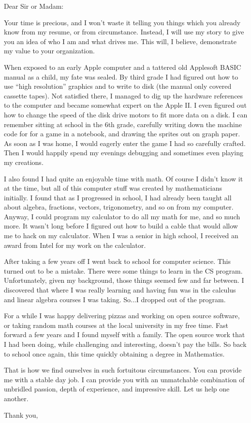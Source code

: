 \documentclass{letter}
\begin{document}
\begin{letter}{}
\opening{Dear Sir or Madam:}

Your time is precious, and I won't waste it telling you things which you already know from my resume, or from circumstance. Instead, I will use my story to give you an idea of who I am and what drives me. This will, I believe, demonstrate my value to your organization.

When exposed to an early Apple computer and a tattered old Applesoft BASIC manual as a child, my fate was sealed. By third grade I had figured out how to use ``high resolution'' graphics and to write to disk (the manual only covered cassette tapes). Not satisfied there, I managed to dig up the hardware references to the computer and became somewhat expert on the Apple II. I even figured out how to change the speed of the disk drive motors to fit more data on a disk. I can remember sitting at school in the 6th grade, carefully writing down the machine code for for a game in a notebook, and drawing the sprites out on graph paper. As soon as I was home, I would eagerly enter the game I had so carefully crafted. Then I would happily spend my evenings debugging and sometimes even playing my creations.

I also found I had quite an enjoyable time with math. Of course I didn't know it at the time, but all of this computer stuff was created by mathematicians initially. I found that as I progressed in school, I had already been taught all about algebra, fractions, vectors, trigonometry, and so on from my computer. Anyway, I could program my calculator to do all my math for me, and so much more. It wasn't long before I figured out how to build a cable that would allow me to hack on my calculator. When I was a senior in high school, I received an award from Intel for my work on the calculator.

After taking a few years off I went back to school for computer science. This turned out to be a mistake. There were some things to learn in the CS program. Unfortunately, given my background, those things seemed few and far between. I discovered that where I was really learning and having fun was in the calculus and linear algebra courses I was taking. So...I dropped out of the program.

For a while I was happy delivering pizzas and working on open source software, or taking random math courses at the local university in my free time. Fast forward a few years and I found myself with a family. The open source work that I had been doing, while challenging and interesting, doesn't pay the bills. So back to school once again, this time quickly obtaining a degree in Mathematics.

That is how we find ourselves in such fortuitous circumstances. You can provide me with a stable day job. I can provide you with an unmatchable combination of unbridled passion, depth of experience, and impressive skill. Let us help one another.


\closing{Thank you,}
\end{letter}
\end{document}
